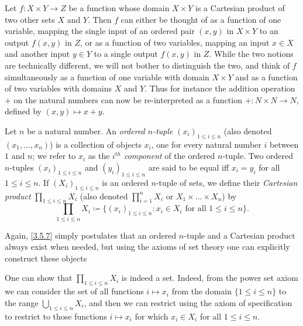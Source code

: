 \begin{note}
  Let \(f : X \times Y \to Z\) be a function whose domain \(X \times Y\) is a Cartesian product of two other sets \(X\) and \(Y\).
  Then \(f\) can either be thought of as a function of one variable, mapping the single input of an ordered pair \((x, y)\) in \(X \times Y\) to an output \(f(x, y)\) in \(Z\), or as a function of two variables, mapping an input \(x \in X\) and another input \(y \in Y\) to a single output \(f(x, y)\) in \(Z\).
  While the two notions are technically different, we will not bother to distinguish the two, and think of \(f\) simultaneously as a function of one variable with domain \(X \times Y\) and as a function of two variables with domains \(X\) and \(Y\).
  Thus for instance the addition operation \(+\) on the natural numbers can now be re-interpreted as a function \(+ : N \times N \to N\), defined by \((x, y) \mapsto x + y\).
\end{note}

\setcounter{theorem}{6}
\begin{definition}\label{3.5.7}
  Let \(n\) be a natural number.
  An \emph{ordered \(n\)-tuple} \((x_i)_{1 \leq i \leq n}\) (also denoted \((x_1, \dots, x_n)\)) is a collection of objects \(x_i\), one for every natural number \(i\) between \(1\) and \(n\);
  we refer to \(x_i\) as the \emph{\(i^{th}\) component} of the ordered \(n\)-tuple.
  Two ordered \(n\)-tuples \((x_i)_{1 \leq i \leq n}\) and \((y_i)_{1 \leq i \leq n}\) are said to be equal iff \(x_i = y_i\) for all \(1 \leq i \leq n\).
  If \((X_i)_{1 \leq i \leq n}\) is an ordered \(n\)-tuple of sets, we define their \emph{Cartesian product} \(\prod_{1 \leq i \leq n} X_i\) (also denoted \(\prod_{i=1}^n X_i\) or \(X_1 \times \dots \times X_n\)) by
  \[
    \prod_{1 \leq i \leq n} X_i \coloneqq \{(x_i)_{1 \leq i \leq n} : x_i \in X_i \text{ for all } 1 \leq i \leq n\}.
  \]
\end{definition}

\begin{note}
  Again, \cref{3.5.7} simply postulates that an ordered \(n\)-tuple and a Cartesian product always exist when needed, but using the axioms of set theory one can explicitly construct these objects
\end{note}

\begin{remark}\label{3.5.8}
  One can show that \(\prod_{1 \leq i \leq n} X_i\) is indeed a set.
  Indeed, from the power set axiom we can consider the set of all functions \(i \mapsto x_i\) from the domain \(\{1 \leq i \leq n\}\) to the range \(\bigcup_{1 \leq i \leq n} X_i\), and then we can restrict using the axiom of specification to restrict to those functions \(i \mapsto x_i\) for which \(x_i \in X_i\) for all \(1 \leq i \leq n\).
\end{remark}

